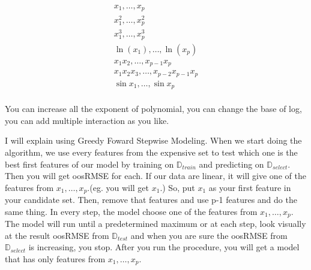 \documentclass[12pt]{article}
\begin{document}
\begin{enumerate}

\[
\begin{array}{l}
x_1, \dots, x_p \\
x_1^2, \dots, x_p^2 \\
x_1^3, \dots, x_p^3 \\
\ln(x_1), \dots, \ln(x_p) \\
x_1x_2, \dots, x_{p-1} x_p \\
x_1 x_2 x_3, \dots, x_{p-2} x_{p-1} x_p\\
\sin{x_1}, \dots, \sin{x_p} \\
\end{array}
\]

You can increase all the exponent of polynomial, you can change the base of log, you can add multiple interaction as you like.


I will explain using Greedy Foward Stepwise Modeling. When we start doing the algorithm, we use every features from the expensive set to test which one is the best first features of our model by training on $\mathbb{D}_{train}$ and predicting on $\mathbb{D}_{select}$. Then you will get oosRMSE for each. If our data are linear, it will give one of the features from $x_1, \dots, x_p$.(eg. you will get $x_1$.) So, put $x_1$ as your first feature in your candidate set. Then, remove that features and use p-1 features and do the same thing. In every step, the model choose one of the features from $x_1, \dots, x_p$. The model will run until a predetermined maximum or at each step, look visually at the result oosRMSE from $\mathbb{D}_{test}$ and when you are sure the oosRMSE from $\mathbb{D}_{select}$ is increasing, you stop. After you run the procedure, you will get a model that has only features from $x_1, \dots, x_p$.

\end{enumerate}


\end{document}
